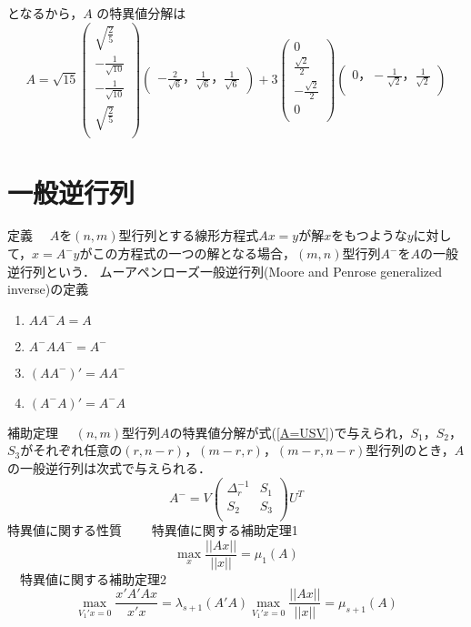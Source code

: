 \documentclass[12pt]{jsarticle}
\begin{document}
となるから，$A$ の特異値分解は
\begin{equation}
  \label{}
  A = \sqrt{15} \left( \begin{array}{rrcr}
  \sqrt{\frac{2}{5}}   \\
  -\frac{1}{\sqrt{10}} \\
  -\frac{1}{\sqrt{10}} \\
  \sqrt{\frac{2}{5}}   \\
  \end{array} \right)
  \left( \begin{array}{rrcr}
  -\frac{2}{\sqrt{6}}，\frac{1}{\sqrt{6}}，\frac{1}{\sqrt{6}}
  \end{array} \right)
  +3
  \left( \begin{array}{rrcr}
  0 \\
  \frac{\sqrt{2}}{2} \\
  -\frac{\sqrt{2}}{2} \\
  0 \\
  \end{array} \right)
  \left( \begin{array}{rrcr}
  0，-\frac{1}{\sqrt{2}}，\frac{1}{\sqrt{2}}\\
  \end{array} \right)
\end{equation}
\section{一般逆行列}

定義
　$A$を$(n,m)$型行列とする線形方程式$Ax=y$が解$x$をもつような$y$に対して，$x=A^-y$がこの方程式の一つの解となる場合，$(m,n)$型行列$A^-$を$A$の一般逆行列という．
ムーアペンローズ一般逆行列(Moore and Penrose generalized inverse)の定義
\begin{enumerate}
  \item $AA^-A = A$
  \item $A^-AA^- = A^-$
  \item $(A A^-)' = AA^-$
  \item $(A^- A)' = A^-A$
\end{enumerate}
補助定理
　$(n,m)$型行列$A$の特異値分解が式(\ref{A=USV})で与えられ，$S_1$，$S_2$，$S_3$がそれぞれ任意の$(r,n-r)$，$(m-r,r)$，$(m-r,n-r)$型行列のとき，$A$の一般逆行列は次式で与えられる．
\begin{equation}
  A^-=V \left( \begin{array}{rrcr}
  \Delta_r^{-1} & S_1 \\
  S_2 & S_3\\
  \end{array} \right)
  U^T
\end{equation}
特異値に関する性質　
　特異値に関する補助定理1
\begin{equation}
  \max_x \frac{||Ax||}{||x||} = \mu_1(A)
\end{equation}
　特異値に関する補助定理2
\begin{equation}
  \max_{V_1'x=0} \frac{x'A'Ax}{x'x} = \lambda_{s+1}(A'A)
  \max_{V_1'x=0} \frac{||Ax||}{||x||} = \mu_{s+1}(A)
\end{equation}
\end{document}
